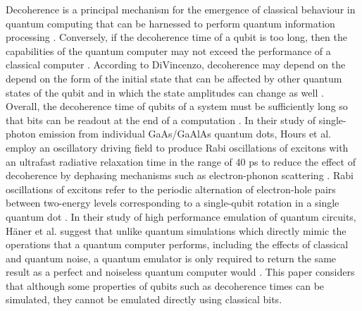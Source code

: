 Decoherence is a principal mechanism for the emergence of classical behaviour in quantum computing that can be harnessed to perform quantum information processing \cite{divincenzo2000physical}. Conversely, if the decoherence time of a qubit is too long, then the capabilities of the quantum computer may not exceed the performance of a classical computer \cite{divincenzo2000physical}. According to DiVincenzo, decoherence may depend on the depend on the form of the initial state that can be affected by other quantum states of the qubit and in which the state amplitudes can change as well \cite{divincenzo2000physical}. Overall, the decoherence time of qubits of a system must be sufficiently long so that bits can be readout at the end of a computation \cite{sherwin1999quantum}. In their study of single-photon emission from individual GaAs/GaAlAs quantum dots, Hours et al. employ an oscillatory driving field to produce Rabi oscillations of excitons with an ultrafast radiative relaxation time in the range of 40 ps to reduce the effect of decoherence by dephasing mechanisms such as electron-phonon scattering \cite{hours2003single}. Rabi oscillations of excitons refer to the periodic alternation of electron-hole pairs between two-energy levels corresponding to a single-qubit rotation in a single quantum dot \cite{hours2003single, stievater2001rabi}. In their study of high performance emulation of quantum circuits, H\"{a}ner et al. suggest that unlike quantum simulations which directly mimic the operations that a quantum computer performs, including the effects of classical and quantum noise, a quantum emulator is only required to return the same result as a perfect and noiseless quantum computer would \cite{haner2016high}. This paper considers that although some properties of qubits such as decoherence times can be simulated, they cannot be emulated directly using classical bits.

